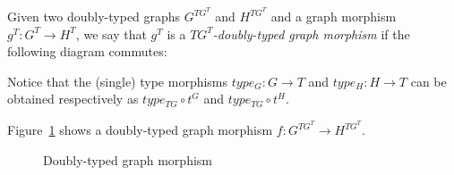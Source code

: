 \begin{definition}
  Given two doubly-typed graphs $G^{TG^T}$ and $H^{TG^T}$ and a graph morphism $g^T : G^T \rightarrow H^T$, we say that $g^T$ is a \emph{$TG^T$-doubly-typed graph morphism} if the following diagram commutes:

\end{definition}

Notice that the (single) type morphisms $type_G : G \rightarrow T$ and $type_H : H \rightarrow T$ can be obtained respectively as $type_{TG} \circ t^G$ and $type_{TG} \circ t^H$.

\begin{example} Figure~\ref{fig:process:doubly-typed-graph-morphism} shows a doubly-typed graph morphism $f : G^{TG^T} \rightarrow H^{TG^T}$.
\end{example}

\begin{figure}[!ht]
  \centering
  \caption{Doubly-typed graph morphism}\label{fig:process:doubly-typed-graph-morphism}
\end{figure}

